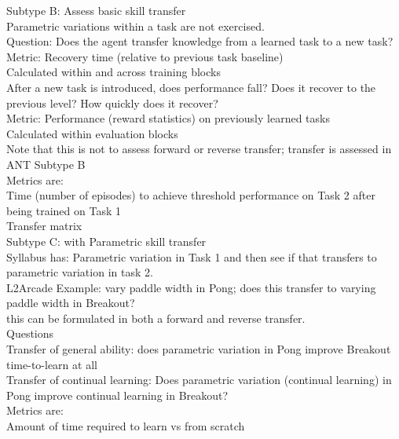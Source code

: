     Subtype B: Assess basic skill transfer\\
        Parametric variations within a task are not exercised.\\
        Question: Does the agent transfer knowledge from a learned task to a new task?\\
            Metric: Recovery time (relative to previous task baseline)\\
                Calculated within and across training blocks \\
                After a new task is introduced, does performance fall? Does it recover to the previous level? How quickly does it recover? \\
            Metric: Performance (reward statistics) on previously learned tasks\\
                Calculated within evaluation blocks\\
                Note that this is not to assess forward or reverse transfer; transfer is assessed in ANT Subtype B\\
        Metrics are:\\
            Time (number of episodes) to achieve threshold performance on Task 2 after being trained on Task 1\\
            Transfer matrix\\
            
    Subtype C: with Parametric skill transfer\\
        Syllabus has: Parametric variation in Task 1 and then see if that transfers to parametric variation in task 2.\\
        L2Arcade Example: vary paddle width in Pong; does this transfer to varying paddle width in Breakout? \\
            this can be formulated in both a forward and reverse transfer.\\
        Questions\\
            Transfer of general ability: does parametric variation in Pong improve Breakout time-to-learn at all\\
            Transfer of continual learning: Does parametric variation (continual learning) in Pong improve continual learning in Breakout?\\
        Metrics are:\\
            Amount of time required to learn vs from scratch \\
            
